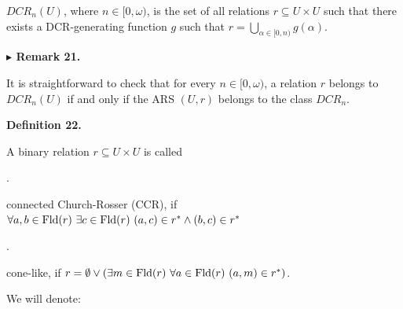 \documentclass[10pt,a4paper]{amsart}
\begin{document}
$DCR_{n}(U)$, where $n\in[0,\omega)$, is the set of all relations $r\subseteq U\times U$ such that there exists a DCR-generating function $g$ such that $r=\bigcup_{\alpha\in[0,n)}g(\alpha)$.\par
 
 
  
 
 
\par\medskip\noindent\textbf{$\blacktriangleright$ Remark 21.}\par
 
 
It is straightforward to check that for every $n\in[0,\omega)$, a relation $r$ belongs to $DCR_{n}(U)$ if and only if the ARS $(U,r)$ belongs to the class $DCR_{n}$.\par
 
 
 
 
\par\medskip\noindent\textbf{Definition 22.}\par
 
 
A binary relation $r\subseteq U\times U$ is called\par
  
\par{}. 
 
connected Church-Rosser (CCR), if $\forall a,b\in\mathrm{Fld}(r)\leavevmode\nobreak\ \exists c\in\mathrm{Fld}(r)%
\leavevmode\nobreak\ (a,c)\in r^{*}\wedge(b,c)\in r^{*}$\par
 
 
 
\par{}. 
 
cone-like, if $r=\emptyset\vee(\exists m\in\mathrm{Fld}(r)\leavevmode\nobreak\ \forall a\in%
\mathrm{Fld}(r)\leavevmode\nobreak\ (a,m)\in r^{*})$.\par
 
 
  
 
 
 
We will denote:\par
  
\end{document}
